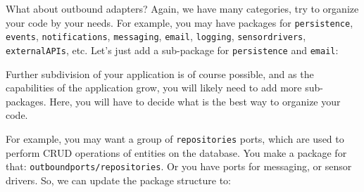 \begin{figure}[h]
\centering
\begin{minipage}{0.8\textwidth}
\end{minipage}
\end{figure}

What about outbound adapters? Again, we have many categories, try to organize your code by your needs. For example, you may have packages for \texttt{persistence}, \texttt{events}, \texttt{notifications}, \texttt{messaging}, \texttt{email}, \texttt{logging}, \texttt{sensordrivers}, \texttt{externalAPIs}, etc. Let's just add a sub-package for \texttt{persistence} and \texttt{email}:

\begin{figure}[h]
\centering
\begin{minipage}{0.8\textwidth}
\end{minipage}
\end{figure}

Further subdivision of your application is of course possible, and as the capabilities of the application grow, you will likely need to add more sub-packages. Here, you will have to decide what is the best way to organize your code.

For example, you may want a group of \texttt{repositories} ports, which are used to perform CRUD operations of entities on the database. You make a package for that: \texttt{outboundports/repositories}. Or you have ports for messaging, or sensor drivers. So, we can update the package structure to:

\begin{figure}[h]
\centering
\begin{minipage}{0.8\textwidth}
\end{minipage}
\end{figure}

